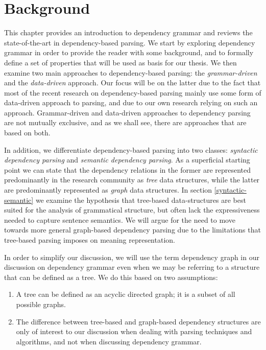 \chapter{Background}
\label{chap:background}

This chapter provides an introduction to dependency grammar and reviews the state-of-the-art in dependency-based parsing. We start by exploring dependency grammar in order to provide the reader with some background, and to formally define a set of properties that will be used as basis for our thesis. We then examine two main approaches to dependency-based parsing: the \textit{grammar-driven} and the \textit{data-driven} approach. Our focus will be on the latter due to the fact that most of the recent research on dependency-based parsing mainly use some form of data-driven approach to parsing, and due to our own research relying on such an approach. Grammar-driven and data-driven approaches to dependency parsing are not mutually exclusive, and as we shall see, there are approaches that are based on both. 

In addition, we differentiate dependency-based parsing into two classes: \textit{syntactic dependency parsing} and \textit{semantic dependency parsing}. As a superficial starting point we can state that the dependency relations in the former are represented predominantly in the research community as \textit{tree} data structures, while the latter are predominantly represented as \textit{graph} data structures. In section \ref{syntactic-semantic} we examine the hypothesis that tree-based data-structures are best suited for the analysis of grammatical structure, but often lack the expressiveness needed to capture sentence semantics. We will argue for the need to move towards more general graph-based dependency parsing due to the limitations that tree-based parsing imposes on meaning representation. 

In order to simplify our discussion, we will use the term dependency graph in our discussion on dependency grammar even when we may be referring to a structure that can be defined as a tree. We do this based on two assumptions: 

\begin{enumerate}
\item A tree can be defined as an acyclic directed graph; it is a subset of all possible graphs.
\item The difference between tree-based and graph-based dependency structures are only of interest to our discussion when dealing with parsing techniques and algorithms, and not when discussing dependency grammar.
\end{enumerate}


